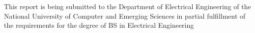 \documentclass[11pt, a4paper, twoside]{Thesis} %
\begin{document}

\begin{center}


{\large This report is being submitted to the Department of Electrical Engineering of the National University of Computer and Emerging Sciences in partial fulfillment of the requirements for the degree of BS in Electrical Engineering}\\[0.5cm]
\end{center}


\end{document}
